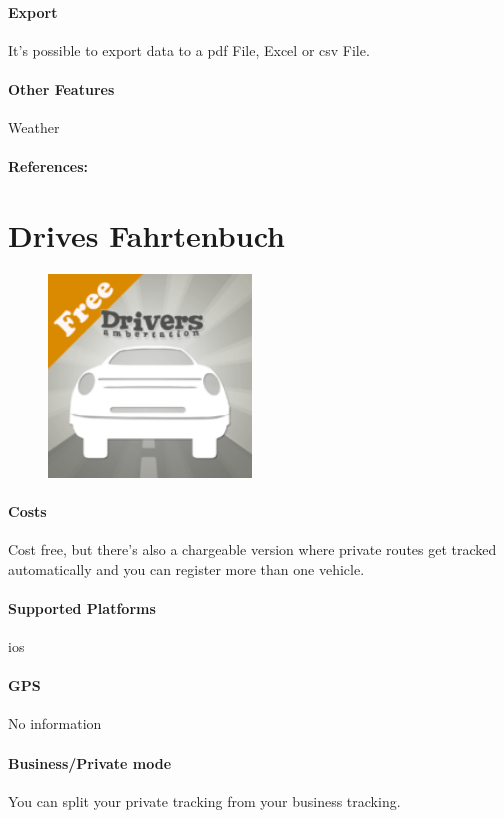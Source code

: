 \paragraph{Export} It’s possible to export data to a \gls{pdf} File, Excel or \gls{csv} File.
\paragraph{Other Features} Weather
\paragraph{References:} \cite{Logbuch_App}
\newpage

\section{Drives Fahrtenbuch}
\begin{figure}
  \begin{center}
    \includegraphics[width=0.48\textwidth]{bilder/drives}
  \end{center}
\end{figure}
\paragraph{Costs} Cost free, but there's also a chargeable version where private routes get tracked automatically and you can register more than one vehicle.
\paragraph{Supported Platforms} \gls{ios}
\paragraph{GPS} No information
\paragraph{Business/Private mode} You can split your private tracking from your business tracking.
